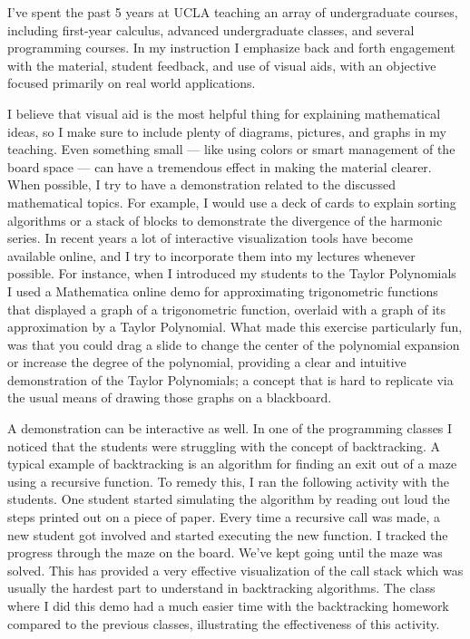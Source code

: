\documentclass[11pt]{article}
\begin{document}
I've spent the past 5 years at UCLA teaching an array of undergraduate courses, including first-year calculus, advanced undergraduate classes, and several programming courses.  In my instruction I emphasize back and forth engagement with the material, student feedback, and use of visual aids, with an objective focused primarily on real world applications.  

I believe that visual aid is the most helpful thing for explaining mathematical ideas, so 
I make sure to include plenty of diagrams, pictures, and graphs in my teaching.
Even something small --- like using colors or smart management of the board space --- can have a tremendous effect in making the material clearer.
When possible, I try to have a demonstration related to the discussed mathematical topics. %
For example, I would use a deck of cards to explain sorting algorithms
or a stack of blocks to demonstrate the divergence of the harmonic series.
In recent years a lot of interactive visualization tools have become available online, and I try to incorporate them into my lectures whenever possible.
For instance, when I introduced my students to the Taylor Polynomials I used a Mathematica online demo for approximating trigonometric functions that displayed a graph of a trigonometric function, overlaid with a graph of its approximation by a Taylor Polynomial.
What made this exercise particularly fun, was that you could drag a slide to change the center of the polynomial expansion or increase the degree of the polynomial, providing a clear and intuitive demonstration of the Taylor Polynomials; a concept that is hard to replicate via the usual means of drawing those graphs on a blackboard.


A demonstration can be interactive as well. In one of the programming classes I noticed that the students were struggling with the concept of backtracking. A typical example of backtracking is an algorithm for finding an exit out of a maze using a recursive function. To remedy this, I ran the following activity with the students. One student started simulating the algorithm by reading out loud the steps printed out on a piece of paper. Every time a recursive call was made, a new student got involved and started executing the new function. I tracked the progress through the maze on the board.
We've kept going until the maze was solved.  This has provided a very effective visualization of the call stack which was usually the hardest part to understand in backtracking algorithms.
The class where I did this demo had a much easier time with the backtracking homework compared to the previous classes, illustrating the effectiveness of this activity.  
\end{document}
